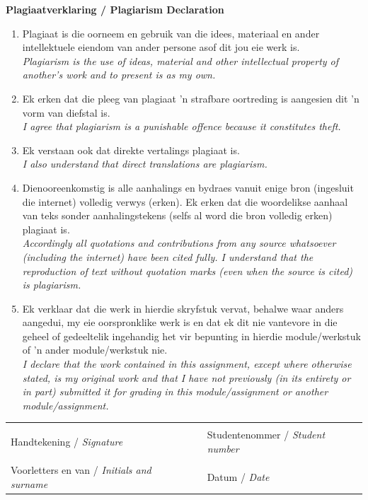 \documentclass[11pt,a4paper]{article}
\begin{document}
{\Large \bf Plagiaatverklaring / Plagiarism Declaration}
\begin{enumerate}
\item Plagiaat is die oorneem en gebruik van die idees, materiaal en ander intellektuele eiendom van ander persone asof dit jou eie werk is.\\
\textit{Plagiarism is the use of ideas, material and other intellectual property of another's work and to present is as my own.}
\item Ek erken dat die pleeg van plagiaat 'n strafbare oortreding is aangesien dit 'n vorm van diefstal is. \\
\textit{I agree that plagiarism is a punishable offence because it constitutes theft.}
\item Ek verstaan ook dat direkte vertalings plagiaat is.\\
\textit{I also understand that direct translations are plagiarism.}
\item Dienooreenkomstig is alle aanhalings en bydraes vanuit enige bron (ingesluit die internet) volledig verwys (erken). Ek erken dat die woordelikse aanhaal van teks sonder aanhalingstekens (selfs al word die bron volledig erken) plagiaat is.\\
\textit{Accordingly all quotations and contributions from any source whatsoever (including the internet) have been cited fully. I understand that the reproduction of text without quotation marks (even when the source is cited) is plagiarism.}
\item Ek verklaar dat die werk in hierdie skryfstuk vervat, behalwe waar anders aangedui, my eie oorspronklike werk is en dat ek dit nie vantevore in die geheel of gedeeltelik ingehandig het vir bepunting in hierdie module/werkstuk of 'n ander module/werkstuk nie.\\
\textit{I declare that the work contained in this assignment, except where otherwise stated, is my original work and that I have not previously (in its entirety or in part) submitted it for grading in this module/assignment or another module/assignment.}
\end{enumerate}
\vspace{1cm}
\begin{table}[ht]
	\begin{center}
		\begin{tabular*}{15.5cm}{@{\extracolsep{\fill}}lll}
			\makebox[8cm]{\hrulefill} &  & \makebox[6cm]{\hrulefill}\\
			Handtekening / \textit{Signature} & & Studentenommer / \textit{Student number}\\[1cm]
			\makebox[8cm]{\hrulefill} & & \makebox[6cm]{\hrulefill}\\ 
			Voorletters en van / \textit{Initials and surname} & & Datum / \textit{Date} \\
		\end{tabular*}
	\end{center}
\end{table}
\newpage
\end{document}
